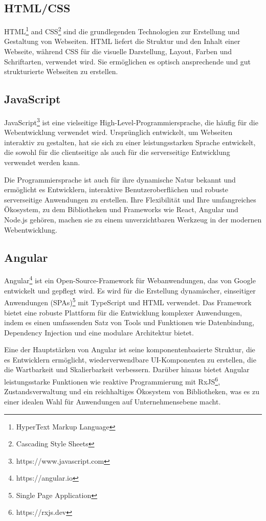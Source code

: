 \subsection{HTML/CSS}

HTML\footnote{HyperText Markup Language} and CSS\footnote{Cascading Style Sheets} sind die grundlegenden Technologien zur Erstellung und Gestaltung von Webseiten. HTML liefert die Struktur und den Inhalt einer Webseite, während CSS für die visuelle Darstellung, Layout, Farben und Schriftarten, verwendet wird. Sie ermöglichen es optisch ansprechende und gut strukturierte Webseiten zu erstellen. \cite{HTML/CSS:2024}

\subsection{JavaScript}

JavaScript\footnote{https://www.javascript.com} ist eine vielseitige High-Level-Programmiersprache, die häufig für die Webentwicklung verwendet wird. Ursprünglich entwickelt, um Webseiten interaktiv zu gestalten, hat sie sich zu einer leistungsstarken Sprache entwickelt, die sowohl für die clientseitige als auch für die serverseitige Entwicklung verwendet werden kann. \cite{JavaScript:2024}

Die Programmiersprache ist auch für ihre dynamische Natur bekannt und ermöglicht es Entwicklern, interaktive Benutzeroberflächen und robuste serverseitige Anwendungen zu erstellen. Ihre Flexibilität und Ihre umfangreiches Ökosystem, zu dem Bibliotheken und Frameworks wie React, Angular und Node.js gehören, machen sie zu einem unverzichtbaren Werkzeug in der modernen Webentwicklung. 

\subsection{Angular}

Angular\footnote{https://angular.io} ist ein Open-Source-Framework für Webanwendungen, das von Google entwickelt und gepflegt wird. Es wird für die Erstellung dynamischer, einseitiger Anwendungen (SPAs)\footnote{Single Page Application} mit TypeScript und HTML verwendet. Das Framework bietet eine robuste Plattform für die Entwicklung komplexer Anwendungen, indem es einen umfassenden Satz von Tools und Funktionen wie Datenbindung, Dependency Injection und eine modulare Architektur bietet. \cite{GOOGLE:2024}

Eine der Hauptstärken von Angular ist seine komponentenbasierte Struktur, die es Entwicklern ermöglicht, wiederverwendbare UI-Komponenten zu erstellen, die die Wartbarkeit und Skalierbarkeit verbessern. Darüber hinaus bietet Angular leistungsstarke Funktionen wie reaktive Programmierung mit RxJS\footnote{https://rxjs.dev}, Zustandsverwaltung und ein reichhaltiges Ökosystem von Bibliotheken, was es zu einer idealen Wahl für Anwendungen auf Unternehmensebene macht.

